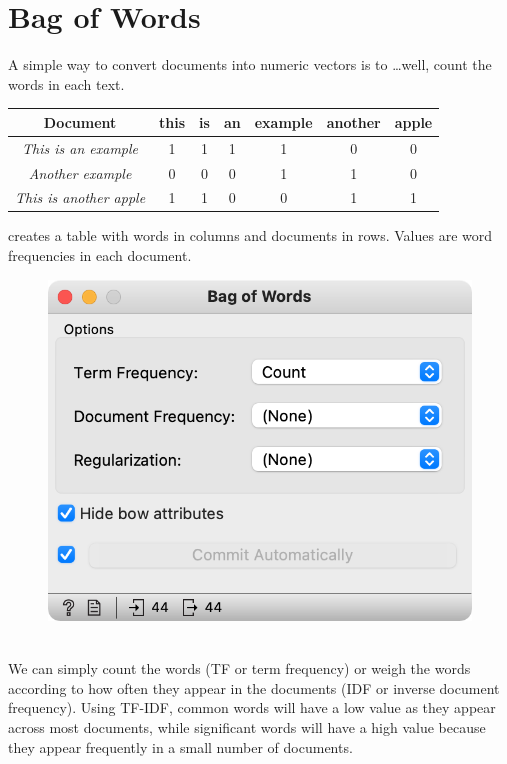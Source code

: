 \chapter{Bag of Words}

 A simple way to convert documents into numeric vectors is to \dots well, count the words in each text.

\begin{center}
    \begin{tabular}{c|c|c|c|c|c|c}
    Document & this & is & an & example & another & apple \\
    \hline
    \emph{This is an example} & 1 & 1 & 1 & 1 & 0 & 0 \\ 
    \emph{Another example} & 0 & 0 & 0 & 1 & 1 & 0 \\  
    \emph{This is another apple} & 1 & 1 & 0 & 0 & 1 & 1    
    \end{tabular}
\end{center}

 creates a table with words in columns and documents in rows. Values are word frequencies in each document.

\begin{figure}
    \includegraphics[scale=0.5]{bag-of-words.png}
    \caption{$\;$}
\end{figure}

We can simply count the words (TF or term frequency) or weigh the words according to how often they appear in the documents (IDF or inverse document frequency). Using TF-IDF, common words will have a low value as they appear across most documents, while significant words will have a high value because they appear frequently in a small number of documents.

